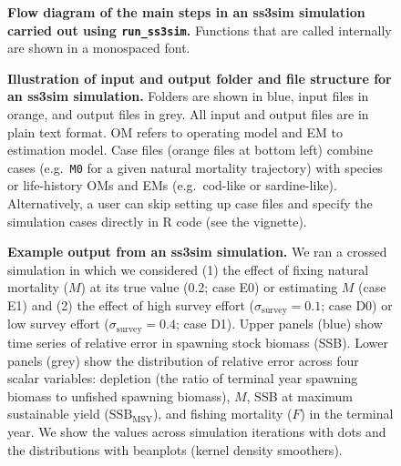 \documentclass[10pt]{article}
\begin{document}
\begin{figure}[!ht]
 \begin{center}
 \end{center}
\caption{
{\bf Flow diagram of the main steps in an ss3sim simulation carried out using
  \texttt{run\_ss3sim}.} Functions that are called internally are shown in a
monospaced font.
}
\label{fig:sim-steps}
\end{figure}


\begin{figure}[!ht]
 \begin{center}
 \end{center}
\caption{
{\bf Illustration of input and output folder and file structure for an ss3sim
  simulation.} Folders are shown in blue, input files in orange, and output
files in grey. All input and output files are in plain text format. OM refers
to operating model and EM to estimation model. Case files (orange files at
bottom left) combine cases (e.g.~\texttt{M0} for a given natural mortality
trajectory) with species or life-history OMs and EMs (e.g.~cod-like or
sardine-like). Alternatively, a user can skip setting up case files and specify
the simulation cases directly in \textsf{R} code (see the vignette).
}
\end{figure}


\begin{figure}[!ht]
 \begin{center}
 \end{center}
\caption{
{\bf Example output from an ss3sim simulation.} We ran a crossed simulation in
which we considered (1) the effect of fixing natural mortality ($M$) at its
true value (0.2; case E0) or estimating $M$ (case E1) and (2) the effect of
high survey effort ($\sigma_\mathrm{survey} = 0.1$; case D0) or low survey
effort ($\sigma_\mathrm{survey} = 0.4$; case D1). Upper panels (blue) show time
series of relative error in spawning stock biomass (SSB). Lower panels (grey)
show the distribution of relative error across four scalar variables: depletion
(the ratio of terminal year spawning biomass to unfished spawning biomass),
$M$, SSB at maximum sustainable yield ($\mathrm{SSB}_\mathrm{MSY}$), and
fishing mortality ($F$) in the terminal year. We show the values across
simulation iterations with dots and the distributions with beanplots (kernel
density smoothers).
}
\label{fig:results}
\end{figure}
\end{document}

